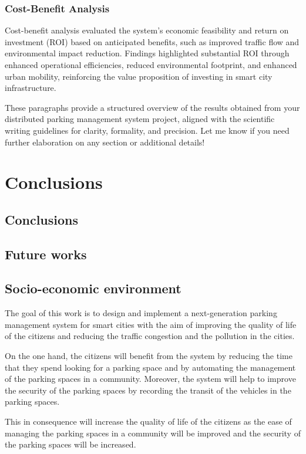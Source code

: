 \documentclass[oneside, 12pt, a4paper, draft]{book}
\begin{document}
\section{Cost-Benefit Analysis}
\label{sec:orge980f49}

Cost-benefit analysis evaluated the system's economic feasibility and return on investment (ROI) based on anticipated benefits, such as improved traffic flow and environmental impact reduction. Findings highlighted substantial ROI through enhanced operational efficiencies, reduced environmental footprint, and enhanced urban mobility, reinforcing the value proposition of investing in smart city infrastructure.

These paragraphs provide a structured overview of the results obtained from your distributed parking management system project, aligned with the scientific writing guidelines for clarity, formality, and precision. Let me know if you need further elaboration on any section or additional details!
\part{Conclusions}
\label{sec:org062f36a}
\chapter{Conclusions}
\label{sec:org62b2e66}
\chapter{Future works}
\label{sec:org0ac8954}
\chapter{Socio-economic environment}
\label{sec:orgda705bd}
The goal of this work is to design and implement a next-generation parking management system for smart cities with the aim of improving the quality of life of the citizens and reducing the traffic congestion and the pollution in the cities.

On the one hand, the citizens will benefit from the system by reducing the time that they spend looking for a parking space and by automating the management of the parking spaces in a community.
Moreover, the system will help to improve the security of the parking spaces by recording the transit of the vehicles in the parking spaces.

This in consequence will increase the quality of life of the citizens as the ease of managing the parking spaces in a community will be improved and the security of the parking spaces will be increased.
\end{document}
